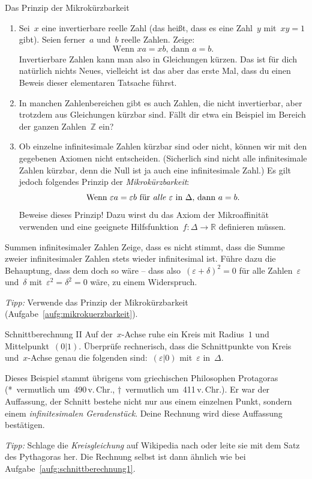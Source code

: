 \documentclass[twoside]{../zirkelblatt}
\newcommand{\ZZ}{\mathbb{Z}}
\newcommand{\RR}{\mathbb{R}}
\theoremstyle{definition}
\theoremstyle{plain}
\theoremstyle{remark}
\begin{document}
\begin{aufgabeShaded}{Das Prinzip der Mikrokürzbarkeit}
\label{aufg:mikrokuerzbarkeit}
\begin{enumerate}
\item Sei~$x$ eine invertierbare reelle Zahl (das heißt, dass es eine Zahl~$y$
mit~$xy = 1$ gibt). Seien ferner~$a$ und~$b$ reelle Zahlen. Zeige:
\[ \text{Wenn $xa = xb$, dann $a = b$.} \]
Invertierbare Zahlen kann man also in Gleichungen kürzen. Das ist für dich
natürlich nichts Neues, vielleicht ist das aber das erste Mal, dass du einen
Beweis dieser elementaren Tatsache führst.

\item In manchen Zahlenbereichen gibt es auch Zahlen, die nicht invertierbar,
aber trotzdem aus Gleichungen kürzbar sind. Fällt dir etwa ein Beispiel im
Bereich der ganzen Zahlen~$\ZZ$ ein?

\item Ob einzelne infinitesimale Zahlen kürzbar sind oder nicht, können wir mit
den gegebenen Axiomen nicht entscheiden. (Sicherlich sind nicht alle
infinitesimale Zahlen kürzbar, denn die Null ist ja auch eine infinitesimale
Zahl.) Es gilt jedoch folgendes Prinzip der \emph{Mikrokürzbarkeit}:
\[ \text{Wenn~$\varepsilon a = \varepsilon b$ für \emph{alle} $\varepsilon$
in~$\Delta$, dann $a = b$.} \]
Beweise dieses Prinzip! Dazu wirst du das Axiom der Mikroaffinität verwenden
und eine geeignete Hilfsfunktion~$f : \Delta \to \RR$ definieren müssen.
\end{enumerate}
\end{aufgabeShaded}

\newpage
\begin{aufgabeShaded}{Summen infinitesimaler Zahlen}
Zeige, dass es nicht stimmt, dass die Summe zweier infinitesimaler Zahlen
stets wieder infinitesimal ist. Führe dazu die Behauptung, dass dem doch so wäre --
dass also~$(\varepsilon + \delta)^2 = 0$ für alle Zahlen~$\varepsilon$
und~$\delta$ mit~$\varepsilon^2 = \delta^2 = 0$ wäre, zu einem Widerspruch.

\emph{Tipp:} Verwende das Prinzip der Mikrokürzbarkeit
(Aufgabe~\ref{aufg:mikrokuerzbarkeit}).
\end{aufgabeShaded}

\begin{aufgabeShaded}{Schnittberechnung II}
Auf der~$x$-Achse ruhe ein Kreis mit Radius~$1$ und Mittelpunkt~$(0|1)$.
Überprüfe rechnerisch, dass die Schnittpunkte von Kreis und~$x$-Achse genau die
folgenden sind:~$(\varepsilon|0)$ mit~$\varepsilon$ in~$\Delta$.

Dieses Beispiel stammt übrigens vom griechischen Philosophen Protagoras
(*~vermutlich um~490\,v.\,Chr., †~vermutlich um~411\,v.\,Chr.). Er
war der Auffassung, der Schnitt bestehe nicht nur aus einem einzelnen Punkt,
sondern einem \emph{infinitesimalen Geradenstück}. Deine Rechnung wird diese
Auffassung bestätigen.

\emph{Tipp:} Schlage die \emph{Kreisgleichung} auf Wikipedia nach oder leite
sie mit dem Satz des Pythagoras her. Die Rechnung selbst ist dann ähnlich wie
bei Aufgabe~\ref{aufg:schnittberechnung1}.
\end{aufgabeShaded}
\end{document}
